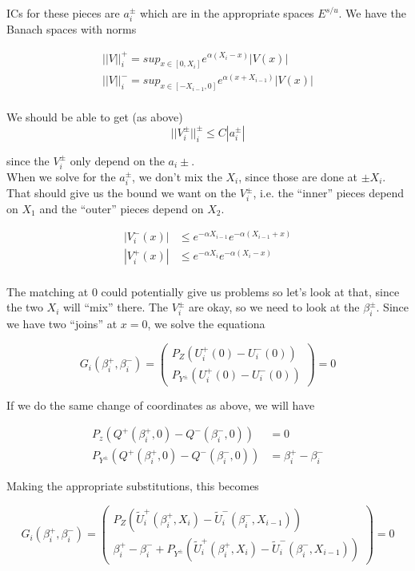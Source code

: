 \documentclass[12pt]{article}
\begin{document}
ICs for these pieces are $a_i^\pm$ which are in the appropriate spaces $E^{s/u}$. We have the Banach spaces with norms

\begin{align*}
||V||_i^+ = sup_{x \in [0, X_i]} e^{\alpha(X_i - x)}|V(x)| \\
||V||_i^- = sup_{x \in [-X_{i-1}, 0]} e^{\alpha(x + X_{i-1})}|V(x)| \\
\end{align*}

We should be able to get (as above)
\[
||V_i^\pm||_i^\pm \leq C |a_i^\pm|
\]

since the $V_i^\pm$ only depend on the $a_i\pm$.\\

When we solve for the $a_i^\pm$, we don't mix the $X_i$, since those are done at $\pm X_i$. That should give us the bound we want on the $V_i^\pm$, i.e. the ``inner'' pieces depend on $X_1$ and the ``outer'' pieces depend on $X_2$.

\begin{align*}
|V_i^-(x)| &\leq e^{-\alpha X_{i-1}} e^{-\alpha(X_{i-1} + x)} \\
|V_i^+(x)| &\leq e^{-\alpha X_i} e^{-\alpha(X_i - x)} \\
\end{align*}

The matching at 0 could potentially give us problems so let's look at that, since the two $X_i$ will ``mix'' there. The $V_i^\pm$ are okay, so we need to look at the $\beta_i^\pm$. Since we have two ``joins'' at $x = 0$, we solve the equationa

\begin{equation}
G_i(\beta_i^+, \beta_i^-) = 
\begin{pmatrix}
P_Z(U_i^+(0) - U_i^-(0)) \\
P_{Y^\pm}(U_i^+(0) - U_i^-(0))
\end{pmatrix} = 0
\end{equation}

If we do the same change of coordinates as above, we will have

\begin{align*}
P_z(Q^+(\beta_i^+, 0) - Q^-(\beta_i^-, 0)) &= 0 \\
P_{Y^\pm}(Q^+(\beta_i^+, 0) - Q^-(\beta_i^-, 0)) &= \beta_i^+ - \beta_i^-
\end{align*}

Making the appropriate substitutions, this becomes

\begin{equation}
G_i(\beta_i^+, \beta_i^-) = 
\begin{pmatrix}
P_Z(\tilde{U}_i^+(\beta_i^+, X_i) - \tilde{U}_i^-(\beta_i^-, X_{i-1})) \\
\beta_i^+ - \beta_i^- + P_{Y^\pm}(\tilde{U}_i^+(\beta_i^+, X_i) - \tilde{U}_i^-(\beta_i^-, X_{i-1}))
\end{pmatrix} = 0
\end{equation}
\end{document}
